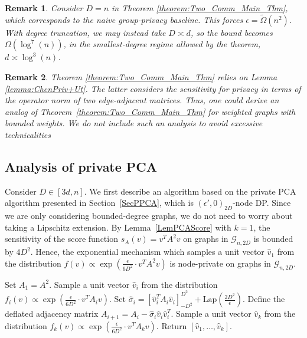 \documentclass{article}
\newtheorem{remark}{Remark}
\begin{document}
\begin{remark}
\label{remark:TC_D=n}
Consider $D = n$ in Theorem \ref{theorem:Two_Comm_Main_Thm}, which corresponds to the naive group-privacy baseline. This
forces $\epsilon = \widetilde{\Omega}(n^2)$. With degree truncation, we may instead take $D \asymp d$, so the bound becomes $\Omega(\log^7(n))$, in the smallest-degree regime allowed by the theorem, $d \asymp \log^3(n)$.
\end{remark}

\begin{remark}
Theorem \ref{theorem:Two_Comm_Main_Thm} relies on Lemma \ref{lemma:ChenPriv+Ut}. The latter considers the sensitivity for privacy in terms of the operator norm of two edge-adjacent matrices. Thus, one could derive an analog of Theorem~\ref{theorem:Two_Comm_Main_Thm} for weighted graphs with bounded weights. We do not include such an analysis to avoid excessive technicalities
\end{remark}


\subsection{Analysis of private PCA}
\label{SecDeflatePCA}

Consider $D \in [3d, n]$. We first describe an algorithm based on the private PCA algorithm presented in Section~\ref{SecPPCA}, which is $(\epsilon', 0)_{2D}$-node DP. Since we are only considering bounded-degree graphs, we do not need to worry about taking a Lipschitz extension. By Lemma~\ref{LemPCAScore} with $k=1$, the sensitivity of the score function $s_A(v) = v^T A^2 v$ on graphs in $\mathcal{G}_{n,2D}$ is bounded by $4D^2$. Hence, the exponential mechanism which samples a unit vector $\hat{v}_1$ from the distribution $f(v) \propto \exp\left(\frac{\epsilon}{6D^2} \cdot v^T A^2 v\right)$ is node-private on graphs in $\mathcal{G}_{n,2D}$.

\begin{algorithm}[h!]
\caption{Private Eigenvector Deflation}
\label{alg:Priv_evec_def}
\begin{algorithmic}[1]
\State Set $A_1 = A^2$.
    \State Sample a unit vector $\hat{v}_i$ from the distribution $f_i(v) \propto \exp\left(\frac{\epsilon}{6D^2} \cdot v^T A_i v\right)$.
        \State Set $\hat{\sigma}_i = \left[\hat{v}_i^T A_i \hat{v}_i\right]_{-D^2}^{D^2} + \mathrm{Lap}\left(\frac{2D^2}{\epsilon}\right)$.
    \State Define the deflated adjacency matrix $A_{i+1} = A_i - \hat{\sigma}_i \hat{v}_i \hat{v}_i^T$.
    \EndFor
\State Sample a unit vector $\hat{v}_k$ from the distribution $f_k(v) \propto \exp\left(\frac{\epsilon}{6D^2} \cdot v^T A_k v\right)$.
\State Return $[\hat{v}_1, \dots, \hat{v}_k]$.
\EndFunction
\end{algorithmic}
\end{algorithm}
\end{document}
